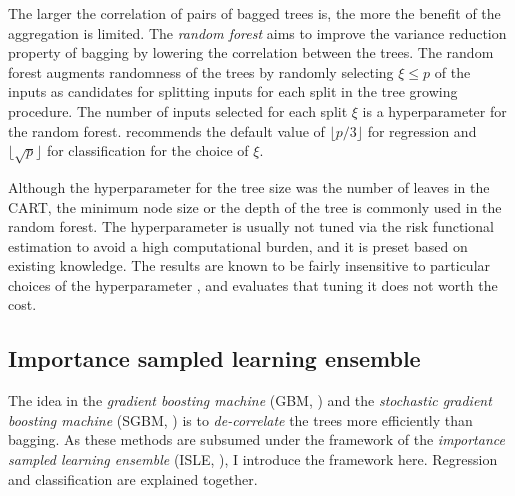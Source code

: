 \documentclass[12pt]{article}
\begin{document}
The larger the correlation of pairs of bagged trees is, the more the benefit of the aggregation is limited. The {\it random forest} \parencite{Breiman2001} aims to improve the variance reduction property of bagging by lowering the correlation between the trees. The random forest augments randomness of the trees by randomly selecting $\xi \leq p$ of the inputs as candidates for splitting inputs for each split in the tree growing procedure. The number of inputs selected for each split $\xi$ is a hyperparameter for the random forest. \textcite{Breiman2001} recommends the default value of $\lfloor p/3 \rfloor$ for regression and $\lfloor \sqrt{p} \rfloor$ for classification for the choice of $\xi$.

Although the hyperparameter for the tree size was the number of leaves in the CART, the minimum node size or the depth of the tree is commonly used in the random forest. The hyperparameter is usually not tuned via the risk functional estimation to avoid a high computational burden, and it is preset based on existing knowledge. The results are known to be fairly insensitive to particular choices of the hyperparameter \parencite{Segal2004}, and \textcite{Hastie2009} evaluates that tuning it does not worth the cost.


\subsection{Importance sampled learning ensemble}

The idea in the {\it gradient boosting machine} (GBM, \textcite{Friedman2001}) and the {\it stochastic gradient boosting machine} (SGBM, \textcite{Friedman2002}) is to {\it de-correlate} the trees more efficiently than bagging. As these methods are subsumed under the framework of the {\it importance sampled learning ensemble} (ISLE, \textcite{Friedman2003}), I introduce the framework here. Regression and classification are explained together.
\end{document}
